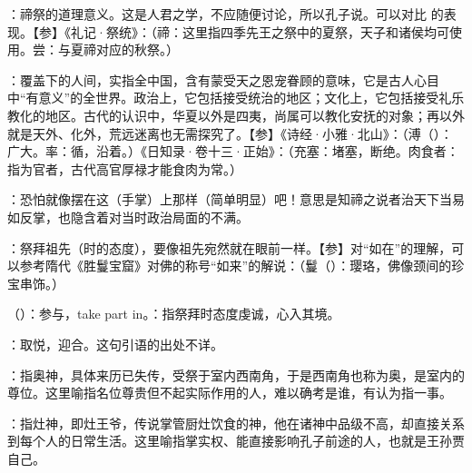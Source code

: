 {
\item {}：禘祭的道理意义。这是人君之学，不应随便讨论，所以孔子说。可以对比  的表现。【参】《礼记·祭统》：（禘：这里指四季先王之祭中的夏祭，天子和诸侯均可使用。尝：与夏禘对应的秋祭。）

\item {}：覆盖下的人间，实指全中国，含有蒙受天之恩宠眷顾的意味，它是古人心目中“有意义”的全世界。政治上，它包括接受统治的地区；文化上，它包括接受礼乐教化的地区。古代的认识中，华夏以外是四夷，尚属可以教化安抚的对象；再以外就是天外、化外，荒远迷离也无需探究了。【参】《诗经·小雅·北山》：（溥（）：广大。率：循，沿着。）《日知录·卷十三·正始》：（充塞：堵塞，断绝。肉食者：指为官者，古代高官厚禄才能食肉为常。）

\item {}：恐怕就像摆在这（手掌）上那样（简单明显）吧！意思是知禘之说者治天下当易如反掌，也隐含着对当时政治局面的不满。
}
{}


{
\item {}：祭拜祖先（时的态度），要像祖先宛然就在眼前一样。【参】对“如在”的理解，可以参考隋代《胜鬘宝窟》对佛的称号“如来”的解说：（鬘（）：璎珞，佛像颈间的珍宝串饰。）
\item {}（）：参与，take part in。：指祭拜时态度虔诚，心入其境。
}
{}  %


{
\item {}：取悦，迎合。这句引语的出处不详。
\item {}：指奥神，具体来历已失传，受祭于室内西南角，于是西南角也称为奥，是室内的尊位。这里喻指名位尊贵但不起实际作用的人，难以确考是谁，有认为指一事。%
\item {}：指灶神，即灶王爷，传说掌管厨灶饮食的神，他在诸神中品级不高，却直接关系到每个人的日常生活。这里喻指掌实权、能直接影响孔子前途的人，也就是王孙贾自己。
}
{}


